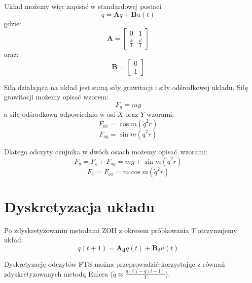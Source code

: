 \documentclass[a4paper, 10pt]{article}
\begin{document}
Układ możemy więc zapisać w standardowej postaci
\begin{equation}
\dot{q} = \textbf{A}q + \textbf{B}u(t)
\end{equation}
gdzie:
\begin{equation}
\mathbf{A} = 	\begin{bmatrix}
	    0 & 1 \\
	    \frac{k}{I} & \frac{d}{I}
	\end{bmatrix}
\end{equation}
oraz:
\begin{equation}
\mathbf{B} = \begin{bmatrix}
	    0 \\
	    1
	\end{bmatrix}
\end{equation}

Siła działająca na układ jest sumą siły grawitacji i siły odśrodkowej układu.
Siłę grawitacji możemy opisać wzorem:
\begin{equation}
F_g = mg
\end{equation}
a siłę odśrodkową odpowiednio w osi $X$ oraz $Y$ wzorami:
\begin{equation}
F_{ox} =  \cos{m(\dot{q}^2 r)}
\end{equation}
\begin{equation}
F_{oy} =  \sin{m(\dot{q}^2 r)}
\end{equation}


Dlatego odczyty czujnika w dwóch osiach możemy opisać wzorami:
\begin{equation}
F_y = F_g + F_{oy} = mg + \sin{m(\dot{q}^2 r)}
\end{equation}
\begin{equation}
F_x = F_{ox} = m\cos{m(\dot{q}^2 r)}
\end{equation}



\section{Dyskretyzacja układu}
Po zdyskretyzowaniu metodami ZOH z okresem próbkowania $T$ otrzymujemy układ:
\begin{equation}
q(t+1) = \mathbf{A_d}q(t) + \mathbf{B}_du(t)
\label{eq:dyskretny}
\end{equation}

Dyskretyzację odczytów FTS można przeprowadzić korzystając z równań zdyskretyzowanych metodą Eulera ($\dot{q} \approx \frac{q(t)-q(t-1)}{T}$). 
\end{document}
